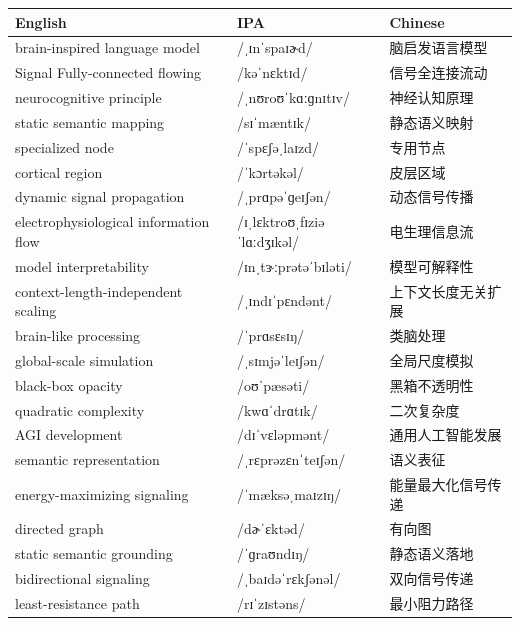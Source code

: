 \documentclass[UTF8,12pt,a4paper]{ctexart}
\providecommand{\zh}[1]{#1}
\begin{document}
\begin{tabular*}{\textwidth}{@{\extracolsep{\fill}}lll@{}}
\toprule
\textbf{English} & \textbf{IPA} & \textbf{Chinese} \\
\midrule
brain-inspired language model & {\ipafont /ˌɪnˈspaɪɚd/} & \zh{脑启发语言模型} \\
Signal Fully-connected flowing & {\ipafont /kəˈnɛktɪd/} & \zh{信号全连接流动} \\
neurocognitive principle & {\ipafont /ˌnʊroʊˈkɑːɡnɪtɪv/} & \zh{神经认知原理} \\
static semantic mapping & {\ipafont /sɪˈmæntɪk/} & \zh{静态语义映射} \\
specialized node & {\ipafont /ˈspɛʃəˌlaɪzd/} & \zh{专用节点} \\
cortical region & {\ipafont /ˈkɔrtəkəl/} & \zh{皮层区域} \\
dynamic signal propagation & {\ipafont /ˌprɑpəˈɡeɪʃən/} & \zh{动态信号传播} \\
electrophysiological information flow & {\ipafont /ɪˌlɛktroʊˌfɪziəˈlɑːdʒɪkəl/} & \zh{电生理信息流} \\
model interpretability & {\ipafont /ɪnˌtɝːprətəˈbɪləti/} & \zh{模型可解释性} \\
context-length-independent scaling & {\ipafont /ˌɪndɪˈpɛndənt/} & \zh{上下文长度无关扩展} \\
brain-like processing & {\ipafont /ˈprɑsɛsɪŋ/} & \zh{类脑处理} \\
global-scale simulation & {\ipafont /ˌsɪmjəˈleɪʃən/} & \zh{全局尺度模拟} \\
black-box opacity & {\ipafont /oʊˈpæsəti/} & \zh{黑箱不透明性} \\
quadratic complexity & {\ipafont /kwɑˈdrɑtɪk/} & \zh{二次复杂度} \\
AGI development & {\ipafont /dɪˈvɛləpmənt/} & \zh{通用人工智能发展} \\
semantic representation & {\ipafont /ˌrɛprəzɛnˈteɪʃən/} & \zh{语义表征} \\
energy-maximizing signaling & {\ipafont /ˈmæksəˌmaɪzɪŋ/} & \zh{能量最大化信号传递} \\
directed graph & {\ipafont /dɚˈɛktəd/} & \zh{有向图} \\
static semantic grounding & {\ipafont /ˈɡraʊndɪŋ/} & \zh{静态语义落地} \\
bidirectional signaling & {\ipafont /ˌbaɪdəˈrɛkʃənəl/} & \zh{双向信号传递} \\
least-resistance path & {\ipafont /rɪˈzɪstəns/} & \zh{最小阻力路径} \\

\end{tabular*}
\end{document}

